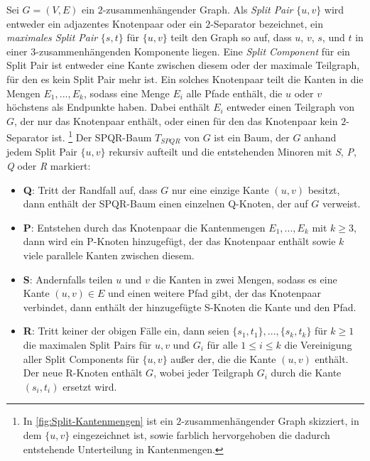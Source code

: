 \begin{definition}
  Sei $G = (V, E)$ ein $2$-zusammenhängender Graph.
  Als \emph{Split Pair} $\{u, v\}$ wird entweder ein adjazentes Knotenpaar oder ein $2$-Separator bezeichnet, ein \emph{maximales Split Pair} $\{s, t\}$ für $\{u, v\}$ teilt den Graph so auf, dass $u$, $v$, $s$, und $t$ in einer $3$-zusammenhängenden Komponente liegen.
  Eine \emph{Split Component} für ein Split Pair ist entweder eine Kante zwischen diesem oder der maximale Teilgraph, für den es kein Split Pair mehr ist.
  Ein solches Knotenpaar teilt die Kanten in die Mengen $E_1, ..., E_k$, sodass eine Menge $E_i$ alle Pfade enthält, die $u$ oder $v$ höchstens als Endpunkte haben.
  Dabei enthält $E_i$ entweder einen Teilgraph von $G$, der nur das Knotenpaar enthält, oder einen für den das Knotenpaar kein $2$-Separator ist.
  \footnote {In \Abb \ref{fig:Split-Kantenmengen} ist ein $2$-zusammenhängender Graph skizziert, in dem $\{u, v\}$ eingezeichnet ist, sowie farblich hervorgehoben die dadurch entstehende Unterteilung in Kantenmengen.}
  Der SPQR-Baum $T_{SPQR}$ von $G$ ist ein Baum, der $G$ anhand jedem Split Pair $\{u, v\}$ rekursiv aufteilt und die entstehenden Minoren mit \emph{S}, \emph{P}, \emph{Q} oder \emph{R} markiert:
  \begin{itemize}
    \item \textbf{Q}: Tritt der Randfall auf, dass $G$ nur eine einzige Kante $(u, v)$ besitzt, dann enthält der SPQR-Baum einen einzelnen Q-Knoten, der auf $G$ verweist.
    \item \textbf{P}: Entstehen durch das Knotenpaar die Kantenmengen $E_1, ..., E_k$ mit $k \geq 3$, dann wird ein P-Knoten hinzugefügt, der das Knotenpaar enthält sowie $k$ viele parallele Kanten zwischen diesem.
    \item \textbf{S}: Andernfalls teilen $u$ und $v$ die Kanten in zwei Mengen, sodass es eine Kante $(u, v) \in E$ und einen weitere Pfad gibt, der das Knotenpaar verbindet, dann enthält der hinzugefügte S-Knoten die Kante und den Pfad.
    \item \textbf{R}: Tritt keiner der obigen Fälle ein, dann seien $\{s_1, t_1\}, ..., \{s_k, t_k\}$ für $k \geq 1$ die maximalen Split Pairs für ${u, v}$ und $G_i$ für alle $1 \leq i \leq k$ die Vereinigung aller Split Components für $\{u, v\}$ außer der, die die Kante $(u, v)$ enthält.
                      Der neue R-Knoten enthält $G$, wobei jeder Teilgraph $G_i$ durch die Kante $(s_i, t_i)$ ersetzt wird.
  \end{itemize}
\end{definition}

